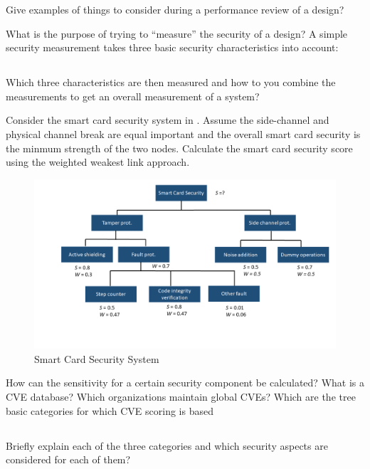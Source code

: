 \begin{questions}
\question{} Give examples of things to consider during a performance review of a design?

\question{} What is the purpose of trying to ``measure'' the security of a design?
\question{} A simple security measurement takes three basic security characteristics into account:
  \begin{parts}
  \part{} Which three characteristics are then measured and how to you combine the measurements to get an overall measurement of a system?
  \end{parts}

\question{} Consider the smart card security system in .
  Assume the side-channel and physical channel break are equal important and the overall smart card security is the minmum strength of the two nodes.
  Calculate the smart card security score using the weighted weakest link approach.
  \begin{figure}[h!]
    \centering
    \includegraphics[scale=0.35]{./Drawings/EITP20-Secure_Systems_Engineering/Smart_Card_Security_System.png}
    \caption{Smart Card Security System}
    \label{fig:Smart_Card_Security_System}
  \end{figure}


\question{} How can the sensitivity for a certain security component be calculated?
\question{} What is a CVE database? Which organizations maintain global CVEs?
\question{} Which are the tree basic categories for which CVE scoring is based
  \begin{parts}
  \part{} Briefly explain each of the three categories and which security aspects are considered for each of them?
  \end{parts}


\end{questions}
